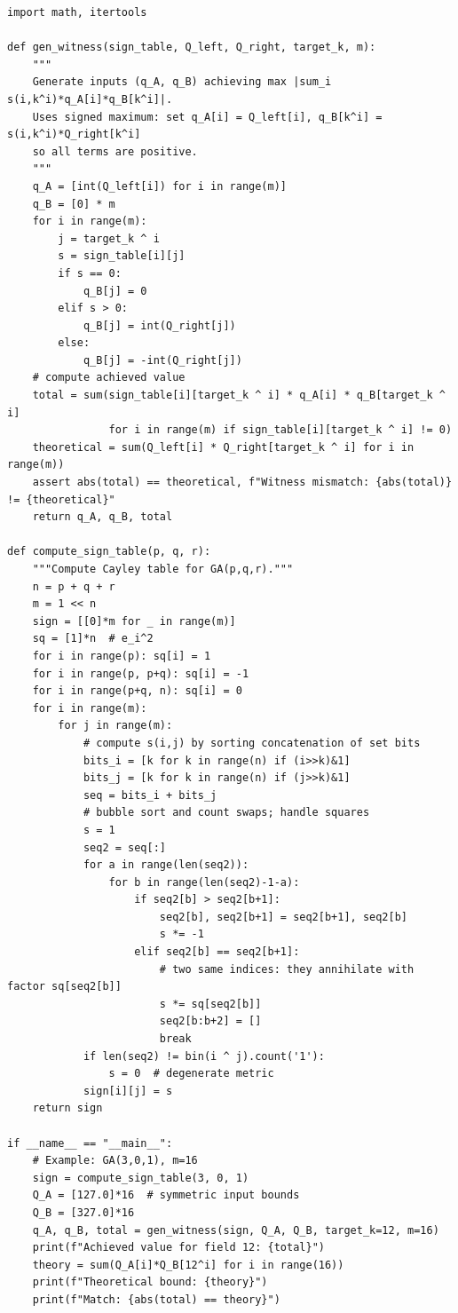 \documentclass[11pt,a4paper]{article}
\theoremstyle{definition}
\theoremstyle{plain}
\theoremstyle{remark}
\begin{document}
\begin{lstlisting}[caption={Adversarial witness input generator},label=lst:witness]
import math, itertools

def gen_witness(sign_table, Q_left, Q_right, target_k, m):
    """
    Generate inputs (q_A, q_B) achieving max |sum_i s(i,k^i)*q_A[i]*q_B[k^i]|.
    Uses signed maximum: set q_A[i] = Q_left[i], q_B[k^i] = s(i,k^i)*Q_right[k^i]
    so all terms are positive.
    """
    q_A = [int(Q_left[i]) for i in range(m)]
    q_B = [0] * m
    for i in range(m):
        j = target_k ^ i
        s = sign_table[i][j]
        if s == 0:
            q_B[j] = 0
        elif s > 0:
            q_B[j] = int(Q_right[j])
        else:
            q_B[j] = -int(Q_right[j])
    # compute achieved value
    total = sum(sign_table[i][target_k ^ i] * q_A[i] * q_B[target_k ^ i]
                for i in range(m) if sign_table[i][target_k ^ i] != 0)
    theoretical = sum(Q_left[i] * Q_right[target_k ^ i] for i in range(m))
    assert abs(total) == theoretical, f"Witness mismatch: {abs(total)} != {theoretical}"
    return q_A, q_B, total

def compute_sign_table(p, q, r):
    """Compute Cayley table for GA(p,q,r)."""
    n = p + q + r
    m = 1 << n
    sign = [[0]*m for _ in range(m)]
    sq = [1]*n  # e_i^2
    for i in range(p): sq[i] = 1
    for i in range(p, p+q): sq[i] = -1
    for i in range(p+q, n): sq[i] = 0
    for i in range(m):
        for j in range(m):
            # compute s(i,j) by sorting concatenation of set bits
            bits_i = [k for k in range(n) if (i>>k)&1]
            bits_j = [k for k in range(n) if (j>>k)&1]
            seq = bits_i + bits_j
            # bubble sort and count swaps; handle squares
            s = 1
            seq2 = seq[:]
            for a in range(len(seq2)):
                for b in range(len(seq2)-1-a):
                    if seq2[b] > seq2[b+1]:
                        seq2[b], seq2[b+1] = seq2[b+1], seq2[b]
                        s *= -1
                    elif seq2[b] == seq2[b+1]:
                        # two same indices: they annihilate with factor sq[seq2[b]]
                        s *= sq[seq2[b]]
                        seq2[b:b+2] = []
                        break
            if len(seq2) != bin(i ^ j).count('1'):
                s = 0  # degenerate metric
            sign[i][j] = s
    return sign

if __name__ == "__main__":
    # Example: GA(3,0,1), m=16
    sign = compute_sign_table(3, 0, 1)
    Q_A = [127.0]*16  # symmetric input bounds
    Q_B = [327.0]*16
    q_A, q_B, total = gen_witness(sign, Q_A, Q_B, target_k=12, m=16)
    print(f"Achieved value for field 12: {total}")
    theory = sum(Q_A[i]*Q_B[12^i] for i in range(16))
    print(f"Theoretical bound: {theory}")
    print(f"Match: {abs(total) == theory}")
\end{lstlisting}
\end{document}
